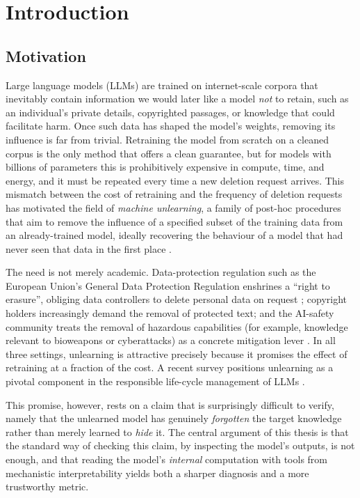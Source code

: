 \chapter{Introduction}
\label{ch:introduction}

\section{Motivation}
\label{sec:motivation}

Large language models (LLMs) are trained on internet-scale corpora that inevitably contain information
we would later like a model \emph{not} to retain, such as an individual's private details, copyrighted
passages, or knowledge that could facilitate harm. Once such data has shaped the model's weights, removing its
influence is far from trivial. Retraining the model from scratch on a cleaned corpus is the only method
that offers a clean guarantee, but for models with billions of parameters this is prohibitively expensive
in compute, time, and energy, and it must be repeated every time a new deletion request arrives. This
mismatch between the cost of retraining and the frequency of deletion requests has motivated the field of
\emph{machine unlearning}, a family of post-hoc procedures that aim to remove the influence of a specified
subset of the training data from an already-trained model, ideally recovering the behaviour of a model
that had never seen that data in the first place \citep{cao2015forget,bourtoule2021machine}.

The need is not merely academic. Data-protection regulation such as the European Union's General Data
Protection Regulation enshrines a ``right to erasure'', obliging data controllers to delete personal data
on request \citep{gdpr2016}; copyright holders increasingly demand the removal of protected text; and the
AI-safety community treats the removal of hazardous capabilities (for example, knowledge relevant to
bioweapons or cyberattacks) as a concrete mitigation lever \citep{li2024wmdp}. In all three settings,
unlearning is attractive precisely because it promises the effect of retraining at a fraction of the cost.
A recent survey positions unlearning as a pivotal component in the responsible life-cycle management of
LLMs \citep{liu2025rethinking}.

This promise, however, rests on a claim that is surprisingly difficult to verify, namely that the unlearned
model has genuinely \emph{forgotten} the target knowledge rather than merely learned to \emph{hide} it. The
central argument of this thesis is that the standard way of checking this claim, by inspecting the model's
outputs, is not enough, and that reading the model's \emph{internal} computation with tools from
mechanistic interpretability yields both a sharper diagnosis and a more trustworthy metric.

